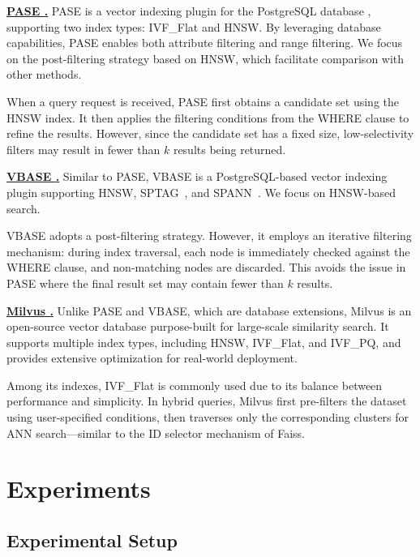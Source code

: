 \documentclass[sigconf, nonacm]{acmart}
\begin{document}
\vspace{1em}
\noindent\textbf{\underline{PASE \cite{pase}.}}  
PASE is a vector indexing plugin for the PostgreSQL database \cite{postgresql13.4}, supporting two index types: IVF\_Flat \cite{johnson2019billion} and HNSW. By leveraging database capabilities, PASE enables both attribute filtering and range filtering. We focus on the post-filtering strategy based on HNSW, which facilitate comparison with other methods.

When a query request is received, PASE first obtains a candidate set using the HNSW index. It then applies the filtering conditions from the WHERE clause to refine the results. However, since the candidate set has a fixed size, low-selectivity filters may result in fewer than $k$ results being returned.

\vspace{1em}
\noindent\textbf{\underline{VBASE \cite{vbase}.}}  
Similar to PASE, VBASE is a PostgreSQL-based vector indexing plugin supporting HNSW, SPTAG~\cite{sptag}, and SPANN~\cite{spann}. We focus on HNSW-based search.

VBASE adopts a post-filtering strategy. However, it employs an iterative filtering mechanism: during index traversal, each node is immediately checked against the WHERE clause, and non-matching nodes are discarded. This avoids the issue in PASE where the final result set may contain fewer than $k$ results.

\vspace{1em}
\noindent\textbf{\underline{Milvus \cite{milvus}.}}  
Unlike PASE and VBASE, which are database extensions, Milvus is an open-source vector database purpose-built for large-scale similarity search. It supports multiple index types, including HNSW, IVF\_Flat, and IVF\_PQ, and provides extensive optimization for real-world deployment.

Among its indexes, IVF\_Flat is commonly used due to its balance between performance and simplicity. In hybrid queries, Milvus first pre-filters the dataset using user-specified conditions, then traverses only the corresponding clusters for ANN search—similar to the ID selector mechanism of Faiss.

\section{Experiments}
\subsection{Experimental Setup}
\end{document}
